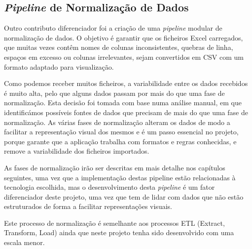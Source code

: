 \subsection{\textit{Pipeline} de Normalização de Dados}

Outro contributo diferenciador foi a criação de uma \textit{pipeline} modular de normalização de dados. O objetivo é garantir que os ficheiros Excel carregados, que muitas vezes contêm nomes de colunas inconsistentes, quebras de linha, espaços em excesso ou colunas irrelevantes, sejam convertidos em CSV com um formato adaptado para visualização. 

Como podemos receber muitos ficheiros, a variabilidade entre os dados recebidos é muito alta, pelo que alguns dados passam por mais do que uma fase de normalização. Esta decisão foi tomada com base numa análise manual, em que identificámos possíveis fontes de dados que precisam de mais do que uma fase de normalização. As várias fases de normalização alteram os dados de modo a facilitar a representação visual dos mesmos e é um passo essencial no projeto, porque garante que a aplicação trabalha com formatos e regras conhecidas, e remove a variabilidade dos ficheiros importados.

As fases de normalização irão ser descritas em mais detalhe nos capítulos seguintes, uma vez que a implementação destas pipeline estão relacionadas à tecnologia escolhida, mas o desenvolvimento desta \textit{pipeline} é um fator diferenciador deste projeto, uma vez que tem de lidar com dados que não estão estruturados de forma a facilitar representações visuais. 

Este processo de normalização é semelhante aos processos ETL (Extract, Transform, Load) ainda que neste projeto tenha sido desenvolvido com uma escala menor.

